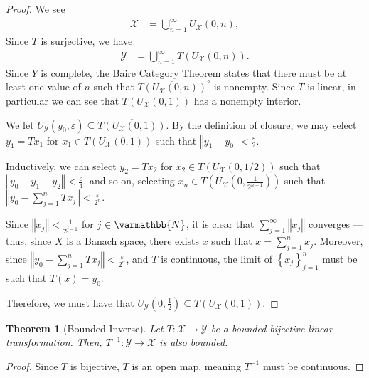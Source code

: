 \documentclass[12pt]{extarticle}
\newcommand{\N}{\mathbb{N}}
\newcommand{\norm}[1]{\left\Vert #1\right\Vert}
\newcommand{\set}[1]{\left\{#1\right\}}
\newcommand{\ve}{\varepsilon}
\theoremstyle{plain}
\newtheorem*{theorem}{Theorem}
\theoremstyle{definition}
\theoremstyle{note}
\renewcommand*{\mathbb}[1]{\varmathbb{#1}}
\renewcommand{\newline}{\hfill\break}
\begin{document}
\begin{proof}
  We see
  \begin{align*}
    \mathcal{X} &= \bigcup_{n=1}^{\infty}U_{\mathcal{X}}(0,n),
  \end{align*}
  Since $T$ is surjective, we have
  \begin{align*}
    \mathcal{Y} &= \bigcup_{n=1}^{\infty}T\left(U_{\mathcal{X}}(0,n)\right).
  \end{align*}
  Since $Y$ is complete, the Baire Category Theorem states that there must be at least one value of $n$ such that $\overline{T\left(U_{\mathcal{X}}(0,n)\right)}^{\circ}$ is nonempty. Since $T$ is linear, in particular we can see that $\overline{T\left(U_{\mathcal{X}}(0,1)\right)}$ has a nonempty interior.\newline

  We let $U_{\mathcal{Y}}\left(y_0,\ve\right)\subseteq \overline{T\left(U_{\mathcal{X}}(0,1)\right)}$. By the definition of closure, we may select $y_1 = Tx_1$ for $x_1 \in T\left(U_{\mathcal{X}}(0,1)\right)$ such that $\norm{y_1 - y_0} < \frac{\ve}{2}$. \newline

  Inductively, we can select $y_2 = Tx_2$ for $x_2 \in T\left(U_{\mathcal{X}}(0,1/2)\right)$ such that $\norm{y_0 - y_1 - y_2} < \frac{\ve}{4}$, and so on, selecting $x_n\in T\left(U_{\mathcal{X}}\left(0,\frac{1}{2^{n-1}}\right)\right)$ such that $\norm{y_0 - \sum_{j=1}^{n}Tx_j} < \frac{\ve}{2^{n}}$.\newline

  Since $\norm{x_j} < \frac{1}{2^{j-1}}$ for $j\in \N$, it is clear that $\sum_{j=1}^{\infty}\norm{x_j}$ converges --- thus, since $X$ is a Banach space, there exists $x$ such that $x = \sum_{j=1}^{n}x_j$. Moreover, since $\norm{y_0 - \sum_{j=1}^{n}Tx_j} < \frac{\ve}{2^n}$, and $T$ is continuous, the limit of $\set{x_j}_{j=1}^{n}$ must be such that $T(x) = y_0$.\newline

  Therefore, we must have that $U_{\mathcal{Y}}\left(0,\frac{1}{2}\right)\subseteq T\left(U_{\mathcal{X}}\left(0,1\right)\right)$.
\end{proof}
\begin{theorem}[Bounded Inverse]
  Let $T: \mathcal{X}\rightarrow \mathcal{Y}$ be a bounded bijective linear transformation. Then, $T^{-1}:\mathcal{Y}\rightarrow \mathcal{X}$ is also bounded.
\end{theorem}
\begin{proof}
  Since $T$ is bijective, $T$ is an open map, meaning $T^{-1}$ must be continuous.
\end{proof}
\end{document}
